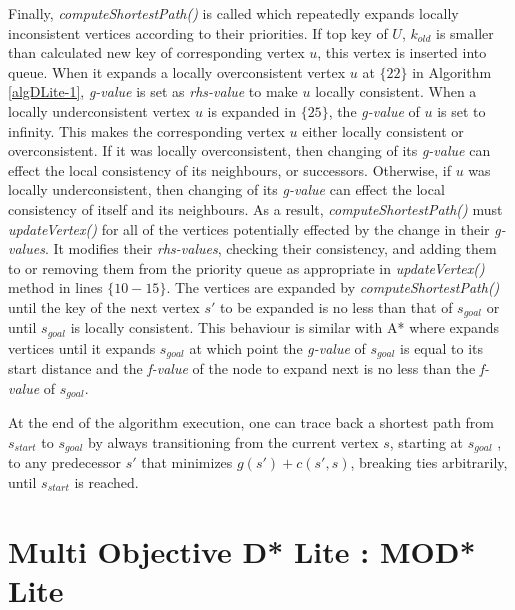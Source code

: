\documentclass[10pt,journal]{IEEEtran}
\begin{document}
Finally, \textit{computeShortestPath()} is called which repeatedly expands locally inconsistent vertices according to their priorities. If top key of $U$, $k_{old}$ is smaller than calculated new key of corresponding vertex $u$, this vertex is inserted into queue. When it expands a locally overconsistent vertex $u$ at $\lbrace 22 \rbrace$ in Algorithm \ref{algDLite-1}, \textit{g-value} is set as \textit{rhs-value} to make $u$ locally consistent. When a locally underconsistent vertex $u$ is expanded in $\lbrace 25 \rbrace$, the \textit{g-value} of $u$ is set to infinity. This makes the corresponding vertex $u$ either locally consistent or overconsistent. If it was locally overconsistent, then changing of its \textit{g-value} can effect the local consistency of its neighbours, or successors. Otherwise, if $u$ was locally underconsistent, then changing of its \textit{g-value} can effect the local consistency of itself and its neighbours. As a result, \textit{computeShortestPath()} must \textit{updateVertex()} for all of the vertices potentially effected by the change in their \textit{g-values}. It modifies their \textit{rhs-values}, checking their consistency, and adding them to or removing them from the priority queue as appropriate in \textit{updateVertex()} method in lines $\lbrace 10 - 15 \rbrace$. The vertices are expanded by \textit{computeShortestPath()} until the key of the next vertex $s'$ to be expanded is no less than that of $s_{goal}$ or until $s_{goal}$ is locally consistent. This behaviour is similar with A* where expands vertices until it expands $s_{goal}$ at which point the \textit{g-value} of $s_{goal}$ is equal to its start distance and the \textit{f-value} of the node to expand next is no less than the \textit{f-value} of $s_{goal}$.

At the end of the algorithm execution, one can trace back a shortest path from $s_{start}$ to $s_{goal}$ by always transitioning from the current vertex $s$, starting at $s_{goal}$ , to any predecessor $s'$ that minimizes $g(s') + c(s',s)$, breaking ties arbitrarily, until $s_{start}$ is reached.

\section{Multi Objective D*  Lite : MOD* Lite}
\label{chapter:proposedAlgorithm}
\end{document}
